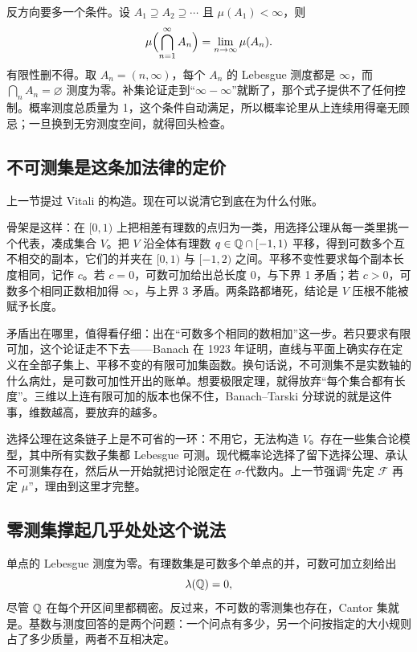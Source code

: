 反方向要多一个条件。设 \(A_1\supseteq A_2\supseteq\cdots\) 且 \(\mu(A_1)<\infty\)，则
\[
\mu\Bigl(\bigcap_{n=1}^{\infty}A_n\Bigr)=\lim_{n\to\infty}\mu(A_n).
\]
有限性删不得。取 \(A_n=(n,\infty)\)，每个 \(A_n\) 的 Lebesgue 测度都是 \(\infty\)，而 \(\bigcap_n A_n=\varnothing\) 测度为零。补集论证走到``\(\infty-\infty\)''就断了，那个式子提供不了任何控制。概率测度总质量为 1，这个条件自动满足，所以概率论里从上连续用得毫无顾忌；一旦换到无穷测度空间，就得回头检查。

\subsection{不可测集是这条加法律的定价}

上一节提过 Vitali 的构造。现在可以说清它到底在为什么付账。

骨架是这样：在 \([0,1)\) 上把相差有理数的点归为一类，用选择公理从每一类里挑一个代表，凑成集合 \(V\)。把 \(V\) 沿全体有理数 \(q\in\mathbb{Q}\cap[-1,1)\) 平移，得到可数多个互不相交的副本，它们的并夹在 \([0,1)\) 与 \([-1,2)\) 之间。平移不变性要求每个副本长度相同，记作 \(c\)。若 \(c=0\)，可数可加给出总长度 0，与下界 1 矛盾；若 \(c>0\)，可数多个相同正数相加得 \(\infty\)，与上界 3 矛盾。两条路都堵死，结论是 \(V\) 压根不能被赋予长度。

矛盾出在哪里，值得看仔细：出在``可数多个相同的数相加''这一步。若只要求有限可加，这个论证走不下去——Banach 在 1923 年证明，直线与平面上确实存在定义在全部子集上、平移不变的有限可加集函数。换句话说，不可测集不是实数轴的什么病灶，是可数可加性开出的账单。想要极限定理，就得放弃``每个集合都有长度''。三维以上连有限可加的版本也保不住，Banach--Tarski 分球说的就是这件事，维数越高，要放弃的越多。

选择公理在这条链子上是不可省的一环：不用它，无法构造 \(V\)。存在一些集合论模型，其中所有实数子集都 Lebesgue 可测。现代概率论选择了留下选择公理、承认不可测集存在，然后从一开始就把讨论限定在 \(\sigma\)-代数内。上一节强调``先定 \(\mathcal F\) 再定 \(\mu\)''，理由到这里才完整。

\subsection{零测集撑起几乎处处这个说法}

单点的 Lebesgue 测度为零。有理数集是可数多个单点的并，可数可加立刻给出
\[
\lambda(\mathbb{Q})=0,
\]
尽管 \(\mathbb{Q}\) 在每个开区间里都稠密。反过来，不可数的零测集也存在，Cantor 集就是。基数与测度回答的是两个问题：一个问点有多少，另一个问按指定的大小规则占了多少质量，两者不互相决定。

